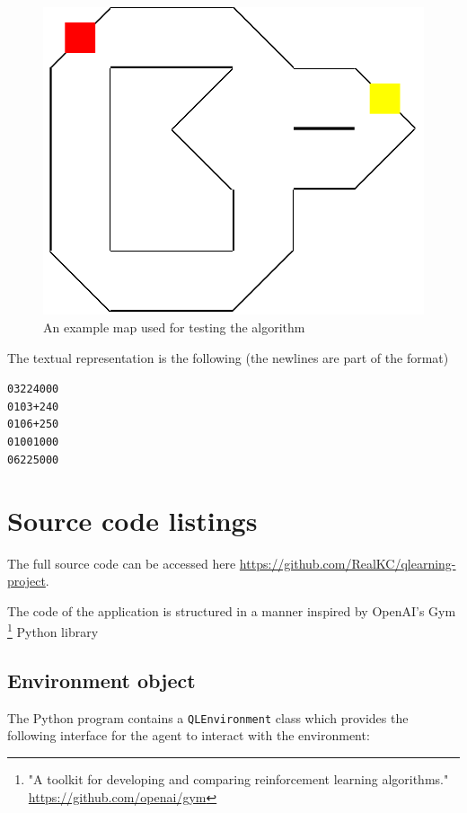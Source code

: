 \documentclass[12pt]{article}
\begin{document}
\begin{figure}[H]

  \includegraphics[width=\linewidth]{map}
  \caption{An example map used for testing the algorithm}
\end{figure}

The textual representation is the following (the newlines are part of the format)
\begin{center}
  \texttt{03224000\\0103+240\\0106+250\\01001000\\06225000}

\end{center}

\section{Source code listings}

The full source code can be accessed here \url{https://github.com/RealKC/qlearning-project}.

The code of the application is structured in a manner inspired by OpenAI's Gym
\footnote{"A toolkit for developing and comparing reinforcement learning algorithms." \url{https://github.com/openai/gym}} Python library\cite{1606.01540}

\subsection{Environment object}
The Python program contains a \texttt{QLEnvironment} class which provides the following interface for
the agent to interact with the environment:
\end{document}
